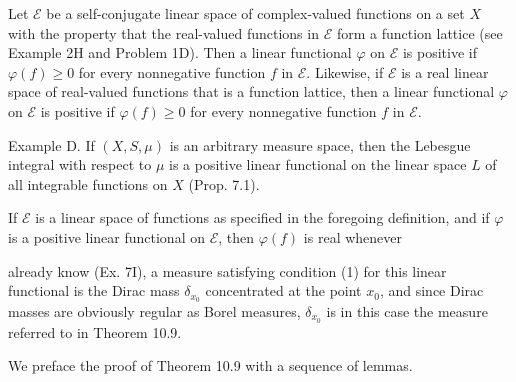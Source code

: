 Let $\mathcal{E}$ be a self-conjugate linear space of complex-valued functions on a set $X$ with the property that the real-valued functions in $\mathcal{E}$ form a function lattice (see Example 2H and Problem 1D). Then a linear functional $\varphi$ on $\mathcal{E}$ is positive if $\varphi(f) \geq 0$ for every nonnegative function $f$ in $\mathcal{E}$. Likewise, if $\mathcal{E}$ is a real linear space of real-valued functions that is a function lattice, then a linear functional $\varphi$ on $\mathcal{E}$ is positive if $\varphi(f) \geq 0$ for every nonnegative function $f$ in $\mathcal{E}$.

Example D. If $(X, S, \mu)$ is an arbitrary measure space, then the Lebesgue integral with respect to $\mu$ is a positive linear functional on the linear space $L$ of all integrable functions on $X$ (Prop. 7.1).

If $\mathcal{E}$ is a linear space of functions as specified in the foregoing definition, and if $\varphi$ is a positive linear functional on $\mathcal{E}$, then $\varphi(f)$ is real whenever

already know (Ex. 7I), a measure satisfying condition (1) for this linear functional is the Dirac mass $\delta_{x_0}$ concentrated at the point $x_0$, and since Dirac masses are obviously regular as Borel measures, $\delta_{x_0}$ is in this case the measure referred to in Theorem 10.9.

We preface the proof of Theorem 10.9 with a sequence of lemmas.
